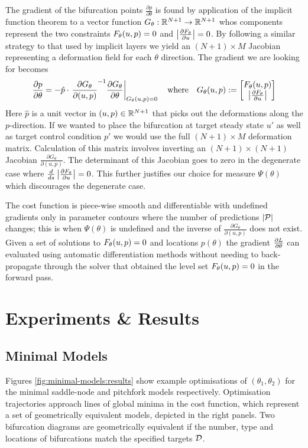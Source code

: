 The gradient of the bifurcation points $\frac{\partial p}{\partial\theta}$ is found by application of the implicit function theorem to a vector function $G_{\theta}:\mathbb{R}^{N+1}\rightarrow\mathbb{R}^{N+1}$ whos components represent the two constraints $F_{\theta}(u,p)=0$ and $\left| \frac{\partial F_{\theta}}{\partial u} \right|=0$. By following a similar strategy to that used by implicit layers \cite{Look2020DifferentiableLayers} we yield an $(N+1)\times M$ Jacobian representing a deformation field \cite{Jos2011OnSurface} for each $\theta$ direction. The gradient we are looking for becomes
\begin{align}
    \frac{\partial p}{\partial\theta} = -\hat{p}\cdot\left.\frac{\partial G_{\theta}}{\partial (u,p)}^{-1}
    \frac{\partial  G_{\theta}}{\partial\theta}\right|_{G_{\theta}(u,p)=0}
    \quad\mathrm{where}\quad
    G_{\theta}(u,p):=\begin{bmatrix}F_{\theta}(u,p)\\\left| \frac{\partial F_{\theta}}{\partial u} \right|\end{bmatrix}
    \label{eq:gradient-bifurcation}
\end{align}
Here $\hat{p}$ is a unit vector in $(u,p)\in\mathbb{R}^{N+1}$ that picks out the deformations along the $p$-direction. If we wanted to place the bifurcation at target steady state $u'$ as well as target control condition $p'$ we would use the full $(N+1)\times M$ deformation matrix. Calculation of this matrix involves inverting an $(N+1)\times(N+1)$ Jacobian $\frac{\partial G_{\theta}}{\partial(u,p)}$. The determinant of this Jacobian goes to zero in the degenerate case where $\frac{d}{ds}\left| \frac{\partial F_{\theta}}{\partial u} \right|=0$. This further justifies our choice for measure $\Psi(\theta)$ which discourages the degenerate case.

The cost function is piece-wise smooth and differentiable with undefined gradients only in parameter contours where the number of predictions $|\mathcal{P}|$ changes; this is when $\Psi(\theta)$ is undefined and the inverse of $\frac{\partial G_{\theta}}{\partial (u,p)}$ does not exist. Given a set of solutions to $F_{\theta}(u,p)=0$ and locations $p(\theta)$ the gradient $\frac{\partial L}{\partial\theta}$ can evaluated using automatic differentiation methods without needing to back-propagate through the solver that obtained the level set $F_{\theta}(u,p)=0$ in the forward pass.

\section{Experiments \& Results}

\subsection{Minimal Models}
Figures \ref{fig:minimal-models:results} show example optimisations of $(\theta_1,\theta_2)$ for the minimal saddle-node and pitchfork models respectively. Optimisation trajectories approach lines of global minima in the cost function, which represent a set of geometrically equivalent models, depicted in the right panels. Two bifurcation diagrams are geometrically equivalent if the number, type and locations of bifurcations match the specified targets $\mathcal{D}$.

